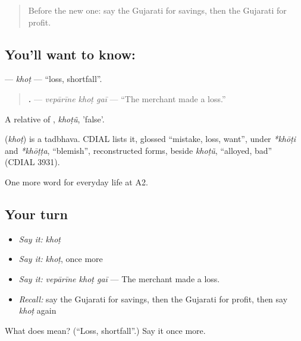 \label{lesson:GU-C191-khot}



\begin{quote}
Before the new one: say the Gujarati for savings, then the Gujarati for profit.
\end{quote}

\subsection*{You'll want to know: }
\textbf{} — \emph{khoṭ} — \textquotedblleft{}loss, shortfall\textquotedblright{}.

\begin{quote}
\textbf{  .} — \emph{vepārīne khoṭ gaī} — \textquotedblleft{}The merchant made a loss.\textquotedblright{}
\end{quote}

A relative of \textbf{}, \emph{khoṭũ}, 'false'.

\begin{cousinweb}
\textbf{} (\emph{khoṭ}) is a tadbhava. CDIAL lists it, glossed \textquotedblleft{}mistake, loss, want\textquotedblright{}, under \emph{*khōṭi} and \emph{*khōṭṭa}, \textquotedblleft{}blemish\textquotedblright{}, reconstructed forms, beside \emph{khoṭũ}, \textquotedblleft{}alloyed, bad\textquotedblright{} (CDIAL 3931).
\end{cousinweb}

\begin{grammarlens}[title={What you've built}]
One more word for everyday life at A2.
\end{grammarlens}

\subsection*{Your turn}
\begin{itemize}
\raggedright
  \item \emph{Say it:} \emph{khoṭ}
  \item \emph{Say it:} \emph{khoṭ}, once more
  \item \emph{Say it:} \emph{vepārīne khoṭ gaī} — The merchant made a loss.
  \item \emph{Recall:} say the Gujarati for savings, then the Gujarati for profit, then say \emph{khoṭ} again
\end{itemize}

\begin{tcolorbox}[breakable,colback=teal!4,colframe=teal!35!black,title={Before you move on}]
What does  mean? (\textquotedblleft{}Loss, shortfall\textquotedblright{}.) Say it once more.
\end{tcolorbox}
